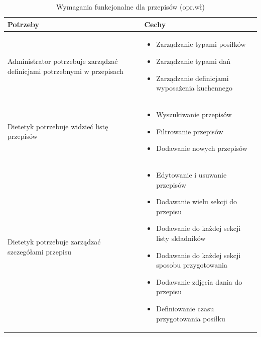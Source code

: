 \begin{minipage}{\textwidth}
    \begin{table}[H]
        \centering\caption{Wymagania funkcjonalne dla przepisów (opr.wł)\label{tabela:wymaganiaFunkcjonalnePrzepisy}}
        \begin{tabular}{|p{}|p{}|}
            \hline
            Potrzeby & Cechy \\

            \hline
            Administrator potrzebuje zarządzać definicjami potrzebnymi w przepisach &
            \begin{itemize}
                \item Zarządzanie typami posiłków
                \item Zarządzanie typami dań
                \item Zarządzanie definicjami wyposażenia kuchennego
            \end{itemize} \\
            \hline
            Dietetyk potrzebuje widzieć listę przepisów &
            \begin{itemize}
                \item Wyszukiwanie przepisów
                \item Filtrowanie przepisów
                \item Dodawanie nowych przepisów
            \end{itemize} \\
            \hline
            Dietetyk potrzebuje zarządzać szczegółami przepisu &
            \begin{itemize}
                \item Edytowanie i usuwanie przepisów
                \item Dodawanie wielu sekcji do przepisu
                \item Dodawanie do każdej sekcji listy składników
                \item Dodawanie do każdej sekcji sposobu przygotowania
                \item Dodawanie zdjęcia dania do przepisu
                \item Definiowanie czasu przygotowania posiłku
            \end{itemize} \\
            \hline
        \end{tabular}
    \end{table}
\end{minipage}


